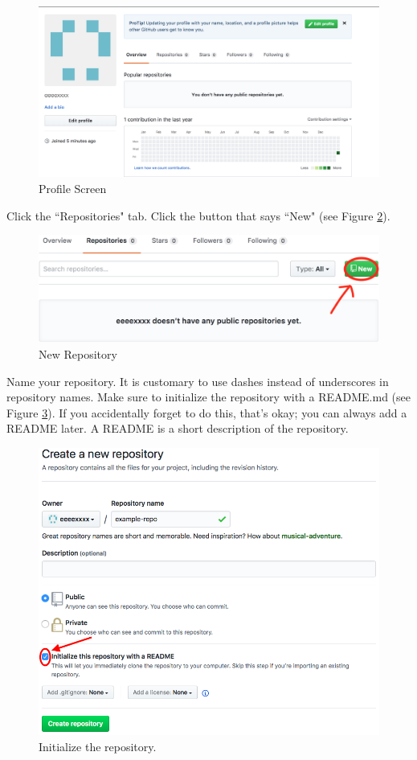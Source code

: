 \documentclass[11pt,a4paper]{article}
\begin{document}
\begin{figure}[h]
\centering
\includegraphics[width=.7\textwidth]{figures/init_profile.png}
\caption{Profile Screen}
\label{fig:init-prof}
\end{figure}

Click the ``Repositories" tab.
Click the button that says ``New" (see Figure \ref{fig:new-repo}).

\begin{figure}[h]
\centering
\includegraphics[width=.7\textwidth]{figures/new_repo.png}
\caption{New Repository}
\label{fig:new-repo}
\end{figure}

Name your repository.
It is customary to use dashes instead of underscores in repository names.
Make sure to initialize the repository with a README.md (see Figure \ref{fig:init-repo}).
If you accidentally forget to do this, that's okay; you can always add a README later.
A README is a short description of the repository.

\begin{figure}[h]
\centering
\includegraphics[width=.7\textwidth]{figures/init_repo.png}
\caption{Initialize the repository.}
\label{fig:init-repo}
\end{figure}
\end{document}
